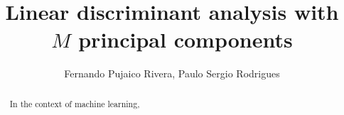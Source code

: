 \documentclass[a4paper,12pt]{article}
\title{Linear discriminant analysis with $M$ principal components}
\author{Fernando Pujaico Rivera, Paulo Sergio Rodrigues}
\begin{document}
\maketitle

\begin{abstract}

In the context of machine learning,
\end{abstract}




\medskip
\printbibliography 
\end{document}
